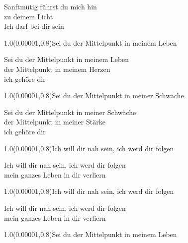 \documentclass[aspectratio=169]{beamer}
\begin{document}
\begin{frame}
\centering
\color{white}
\huge{Sanftmütig führst du mich hin} \\
\huge{zu deinem Licht} \\
\huge{Ich darf bei dir sein} \\

\begin{textblock}{1.0}(0.00001,0.8)\color{gray}\normalsize{Sei du der Mittelpunkt in meinem Leben}\end{textblock}
\end{frame}

\begin{frame}
\centering
\color{white}
\huge{Sei du der Mittelpunkt in meinem Leben} \\
\huge{der Mittelpunkt in meinem Herzen} \\
\huge{ich gehöre dir} \\

\begin{textblock}{1.0}(0.00001,0.8)\color{gray}\normalsize{Sei du der Mittelpunkt in meiner Schwäche}\end{textblock}
\end{frame}

\begin{frame}
\centering
\color{white}
\huge{Sei du der Mittelpunkt in meiner Schwäche} \\
\huge{der Mittelpunkt in meiner Stärke} \\
\huge{ich gehöre dir} \\

\begin{textblock}{1.0}(0.00001,0.8)\color{gray}\normalsize{Ich will dir nah sein, ich werd dir folgen}\end{textblock}
\end{frame}

\begin{frame}
\centering
\color{white}
\huge{Ich will dir nah sein, ich werd dir folgen} \\
\huge{mein ganzes Leben in dir verliern} \\

\begin{textblock}{1.0}(0.00001,0.8)\color{gray}\normalsize{Ich will dir nah sein, ich werd dir folgen}\end{textblock}
\end{frame}

\begin{frame}
\centering
\color{white}
\huge{Ich will dir nah sein, ich werd dir folgen} \\
\huge{mein ganzes Leben in dir verliern} \\

\begin{textblock}{1.0}(0.00001,0.8)\color{gray}\normalsize{Sei du der Mittelpunkt in meinem Leben}\end{textblock}
\end{frame}
\end{document}
